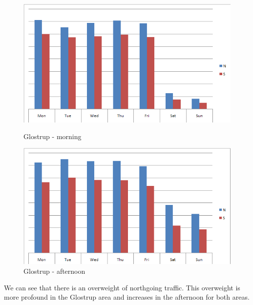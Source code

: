 \begin{figure}[ht]

    \begin{minipage}[b]{0.5\linewidth}

\centering
\includegraphics[scale=0.25]{glostrup_direction_proportions_morning.png} 
\caption{Glostrup - morning}
\label{fig:glostrup_props_morning}

    \end{minipage}
    \hspace{0.5cm}
    \begin{minipage}[b]{0.5\linewidth}
    
\centering
\includegraphics[scale=0.25]{glostrup_direction_proportions_afternoon.png}
\caption{Glostrup - afternoon}
\label{fig:glostrup_props_afternoon}

    \end{minipage}

\end{figure}

We can see that there is an overweight of northgoing traffic. This overweight is more profound in the Glostrup area and increases in the afternoon for both areas.

